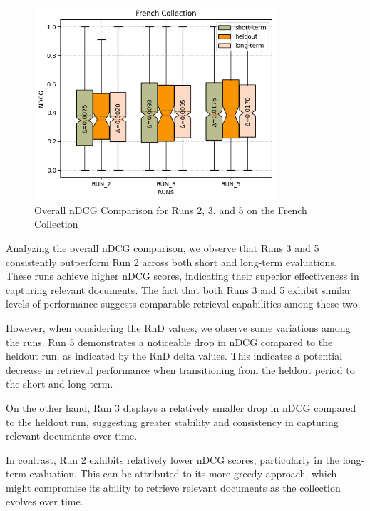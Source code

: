 \begin{figure}[!h]
\centering
\includegraphics[width=0.8\textwidth]{figure/StatisticalAnalysis/BoxPlot/NDGC French.png}
\caption{Overall \ac{nDCG} Comparison for Runs 2, 3, and 5 on the French Collection}
\label{fig:overall_ndcg_french_boxplot}
\end{figure}

Analyzing the overall \ac{nDCG} comparison, we observe that Runs 3 and 5 consistently outperform Run 2 across both short and long-term evaluations. 
These runs achieve higher \ac{nDCG} scores, indicating their superior effectiveness in capturing relevant documents. 
The fact that both Runs 3 and 5 exhibit similar levels of performance suggests comparable retrieval capabilities among these two.

However, when considering the \ac{RnD} values, we observe some variations among the runs. 
Run 5 demonstrates a noticeable drop in \ac{nDCG} compared to the heldout run, as indicated by the \ac{RnD} delta values. 
This indicates a potential decrease in retrieval performance when transitioning from the heldout period to the short and long term.

On the other hand, Run 3 displays a relatively smaller drop in \ac{nDCG} compared to the heldout run, suggesting greater stability and consistency in capturing relevant documents over time.

In contrast, Run 2 exhibits relatively lower \ac{nDCG} scores, particularly in the long-term evaluation. This can be attributed to its more greedy approach, which might compromise its ability to retrieve relevant documents as the collection evolves over time.


\newpage
